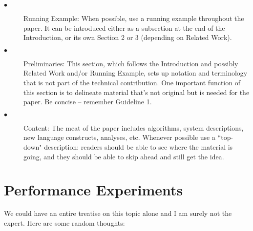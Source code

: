\documentclass[10pt,twocolumn]{article}
\begin{document}
\begin{description}
  \item[$\bullet$]  Running Example: When possible, use a running example throughout the paper. It can be introduced either as a subsection at the end of the Introduction, or its own Section 2 or 3 (depending on Related Work).
  \item[$\bullet$]  Preliminaries: This section, which follows the Introduction and possibly Related Work and/or Running Example, sets up notation and terminology that is not part of the technical contribution. One important function of this section is to delineate material that's not original but is needed for the paper. Be concise -- remember Guideline 1.
    \item[$\bullet$] Content: The meat of the paper includes algorithms, system descriptions, new language constructs, analyses, etc. Whenever possible use a ``top-down" description: readers should be able to see where the material is going, and they should be able to skip ahead and still get the idea.
\end{description}


\section{Performance Experiments}

We could have an entire treatise on this topic alone and I am surely not the expert. Here are some random thoughts:
\end{document}
